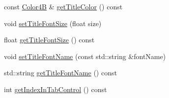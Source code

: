 \begin{DoxyCompactItemize}
\item 
const \hyperlink{structColor4B}{Color4B} \& \hyperlink{classui_1_1TabHeader_a7430d71c2580112511e7cc87d360b7db}{get\+Title\+Color} () const
\item 
void \hyperlink{classui_1_1TabHeader_a33acd32f08867b83ae4f598c2b524e78}{set\+Title\+Font\+Size} (float size)
\item 
float \hyperlink{classui_1_1TabHeader_acc9946cbc737165413b60f73c6a28bf9}{get\+Title\+Font\+Size} () const
\item 
void \hyperlink{classui_1_1TabHeader_aae4fb72cc0d477b482c98ff34d7aaf82}{set\+Title\+Font\+Name} (const std\+::string \&font\+Name)
\item 
std\+::string \hyperlink{classui_1_1TabHeader_a24b42bb16f6d2f8bdf66ac9aada7da4e}{get\+Title\+Font\+Name} () const
\item 
int \hyperlink{classui_1_1TabHeader_a1c469440c9a80bba3f4a38c8ff9ce5c6}{get\+Index\+In\+Tab\+Control} () const
\end{DoxyCompactItemize}
